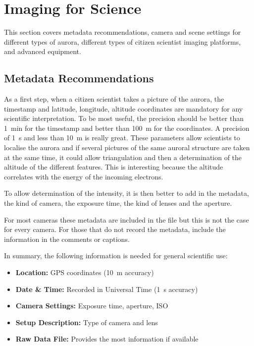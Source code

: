 \documentclass{article}
\begin{document}
\section{Imaging for Science}\label{imaging-for-science} 


This section covers metadata recommendations, camera and scene settings for different types of aurora, different types of citizen scientist imaging platforms, and advanced equipment.

\subsection{Metadata Recommendations} 

As a first step, when a citizen scientist takes a picture of the aurora, the timestamp and latitude, longitude, altitude coordinates are mandatory for any scientific interpretation. To be most useful, the precision should be better than 1~min for the timestamp and better than 100~m for the coordinates. A precision of 1~s and less than 10~m is really great.
These parameters allow scientists to localise the aurora and if several pictures of the same auroral structure are taken at the same time, it could allow triangulation and then a determination of the altitude of the different features. This is interesting because the altitude correlates with the energy of the incoming electrons.

To allow determination of the intensity, it is then better to add in the metadata, the kind of camera, the exposure time, the kind of lenses and the aperture.

For most cameras these metadata are included in the file but this is not the case for every camera. For those that do not record the metadata, include the information in the comments or captions. 

In summary, the following information is needed for general scientific use:
\begin{itemize}
    \item \textbf{Location:} GPS coordinates (10~m accuracy)
    \item \textbf{Date \& Time:} Recorded in Universal Time (1~s accuracy)
    \item \textbf{Camera Settings:} Exposure time, aperture, ISO
    \item \textbf{Setup Description:} Type of camera and lens
    \item \textbf{Raw Data File:} Provides the most information if available
\end{itemize}
\end{document}
